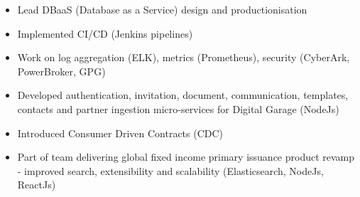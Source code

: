 \documentclass[10pt,a4paper]{altacv}
\begin{document}

\begin{fullwidth}
\makecvheader
\end{fullwidth}


\begin{itemize}
\item Lead DBaaS (Database as a Service) design and productionisation
\item Implemented CI/CD (Jenkins pipelines)
\item Work on log aggregation (ELK), metrics (Prometheus), security (CyberArk, PowerBroker, GPG)
\end{itemize}

\divider

\begin{itemize}
\item Developed authentication, invitation, document, communication, templates, contacts and partner ingestion micro-services for Digital Garage (NodeJs)
\item Introduced Consumer Driven Contracts (CDC)
\end{itemize}

\divider

\begin{itemize}
\item Part of team delivering global fixed income primary issuance product revamp - improved search, extensibility and scalability (Elasticsearch, NodeJs, ReactJs)
\end{itemize}
\end{document}
